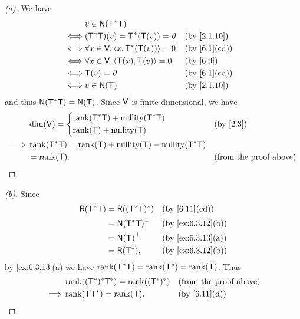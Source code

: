 \begin{proof}[(a)]
	We have
	\begin{align*}
		     & v \in \ns{\T^* \T}                                           \\
		\iff & (\T^* \T)(v) = \T^*(\T(v)) = \zv           &  & \by{2.1.10}  \\
		\iff & \forall x \in \V, \inn{x, \T^*(\T(v))} = 0 &  & \by{6.1}[cd] \\
		\iff & \forall x \in \V, \inn{\T(x), \T(v)} = 0   &  & \by{6.9}     \\
		\iff & \T(v) = \zv                                &  & \by{6.1}[cd] \\
		\iff & v \in \ns{\T}                              &  & \by{2.1.10}
	\end{align*}
	and thus \(\ns{\T^* \T} = \ns{\T}\).
	Since \(\mathsf{V}\) is finite-dimensional, we have
	\begin{align*}
		         & \dim(\V) = \begin{dcases}
			                      \rk{\T^* \T} + \nt{\T^* \T} \\
			                      \rk{\T} + \nt{\T}
		                      \end{dcases}                  &  & \by{2.3}                             \\
		\implies & \rk{\T^* \T} = \rk{\T} + \nt{\T} - \nt{\T^* \T}                                    \\
		         & = \rk{\T}.                                      &  & \text{(from the proof above)}
	\end{align*}
\end{proof}

\begin{proof}[(b)]
	Since
	\begin{align*}
		\rg{\T^* \T} & = \rg{(\T^* \T)^*}     &  & \by{6.11}[cd]     \\
		             & = \ns{\T^* \T}^{\perp} &  & \by{ex:6.3.12}[b] \\
		             & = \ns{\T}^{\perp}      &  & \by{ex:6.3.13}[a] \\
		             & = \rg{\T^*},           &  & \by{ex:6.3.12}[b]
	\end{align*}
	by \cref{ex:6.3.13}(a) we have \(\rk{\T^* \T} = \rk{\T^*} = \rk{\T}\).
	Thus
	\begin{align*}
		         & \rk{(\T^*)^* \T^*} = \rk{(\T^*)^*} &  & \text{(from the proof above)} \\
		\implies & \rk{\T \T^*} = \rk{\T}.            &  & \by{6.11}[d]
	\end{align*}
\end{proof}

